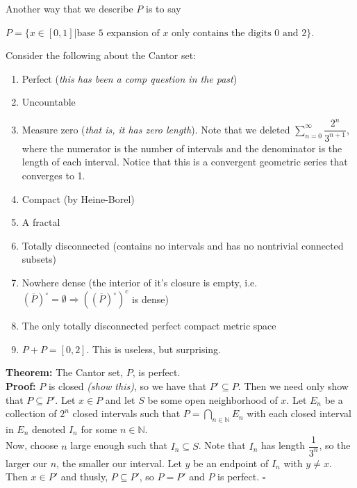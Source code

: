 \documentclass{article}
\begin{document}
Another way that we describe $P$ is to say

\begin{center}
    $P = \{x \in [0,1] \big| \text{base }5 \text{ expansion of }x \text{ only contains the digits }0 \text{ and } 2\}$.
\end{center}

Consider the following about the Cantor set:

\begin{enumerate}
    \item Perfect (\textit{this has been a comp question in the past})
    \item Uncountable
    \item Measure zero (\textit{that is, it has zero length}). Note that we deleted $\sum_{n = 0}^{\infty}\dfrac{2^n}{3^{n+1}}$, where the numerator is the number of intervals and the denominator is the length of each interval. Notice that this is a convergent geometric series that converges to 1.
    \item Compact (by Heine-Borel)
    \item A fractal
    \item Totally disconnected (contains no intervals and has no nontrivial connected subsets)
    \item Nowhere dense (the interior of it's closure is empty, i.e. $(\overline{P})^{\circ} = \emptyset \Longrightarrow  ((\overline{P})^{\circ})^c$ is dense)
    \item The only totally disconnected perfect compact metric space
    \item $P+P = [0,2]$. This is useless, but surprising.
\end{enumerate}


\textbf{Theorem:} The Cantor set, $P$, is perfect.\\

\textbf{Proof:} $P$ is closed \textit{(show this)}, so we have that $P' \subseteq P$. Then we need only show that $P \subseteq P'$. Let $x \in P$ and let $S$ be some open neighborhood of $x$. Let $E_n$ be a collection of $2^n$ closed intervals such that $P = \bigcap_{n \in \mathbb{N}} E_n$ with each closed interval in $E_n$ denoted $I_n$ for some $n \in \mathbb{N}$. \\

Now, choose $n$ large enough such that $I_n \subseteq S$. Note that $I_n$ has length $\dfrac{1}{3^n}$, so the larger our $n$, the smaller our interval. Let $y$ be an endpoint of $I_n$ with $y \neq x$. Then $x \in P'$ and thusly, $P \subseteq P'$, so $P = P'$ and $P$ is perfect. $\square$\\
\end{document}

